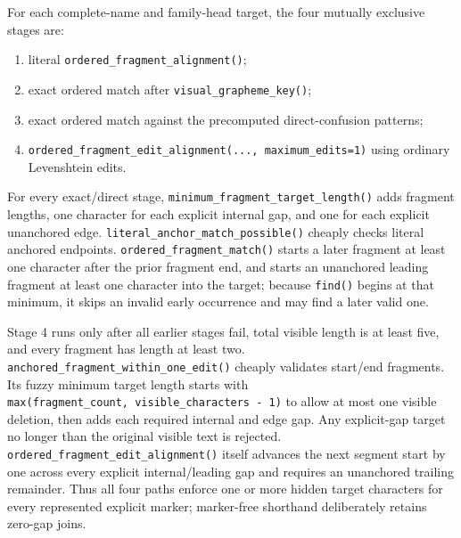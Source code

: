For each complete-name and family-head target, the four mutually exclusive stages are:

\begin{enumerate}
\def\labelenumi{\arabic{enumi}.}
\tightlist
\item
  literal \texttt{ordered\_\allowbreak{}fragment\_\allowbreak{}alignment()};
\item
  exact ordered match after \texttt{visual\_\allowbreak{}grapheme\_\allowbreak{}key()};
\item
  exact ordered match against the precomputed direct-confusion patterns;
\item
  \texttt{ordered\_\allowbreak{}fragment\_\allowbreak{}edit\_\allowbreak{}alignment(...,\ maximum\_\allowbreak{}edits=1)} using ordinary Levenshtein edits.
\end{enumerate}

For every exact/direct stage, \texttt{minimum\_\allowbreak{}fragment\_\allowbreak{}target\_\allowbreak{}length()} adds fragment lengths, one character for each explicit internal gap, and one for each explicit unanchored edge. \texttt{literal\_\allowbreak{}anchor\_\allowbreak{}match\_\allowbreak{}possible()} cheaply checks literal anchored endpoints. \texttt{ordered\_\allowbreak{}fragment\_\allowbreak{}match()} starts a later fragment at least one character after the prior fragment end, and starts an unanchored leading fragment at least one character into the target; because \texttt{find()} begins at that minimum, it skips an invalid early occurrence and may find a later valid one.

Stage 4 runs only after all earlier stages fail, total visible length is at least five, and every fragment has length at least two. \texttt{anchored\_\allowbreak{}fragment\_\allowbreak{}within\_\allowbreak{}one\_\allowbreak{}edit()} cheaply validates start/end fragments. Its fuzzy minimum target length starts with \texttt{max(fragment\_\allowbreak{}count,\ visible\_\allowbreak{}characters\ -\ 1)} to allow at most one visible deletion, then adds each required internal and edge gap. Any explicit-gap target no longer than the original visible text is rejected. \texttt{ordered\_\allowbreak{}fragment\_\allowbreak{}edit\_\allowbreak{}alignment()} itself advances the next segment start by one across every explicit internal/leading gap and requires an unanchored trailing remainder. Thus all four paths enforce one or more hidden target characters for every represented explicit marker; marker-free shorthand deliberately retains zero-gap joins.

